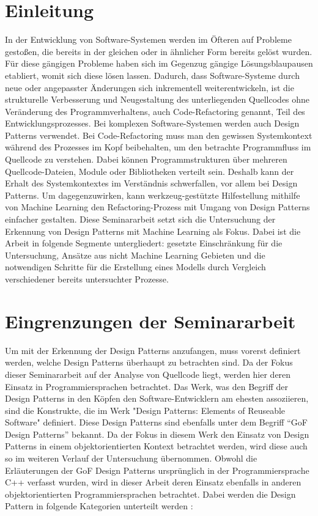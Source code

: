 \documentclass[conference]{IEEEtran}
\begin{document}
\section{Einleitung}
In der Entwicklung von Software-Systemen werden im Öfteren auf Probleme gestoßen, die bereits in der gleichen oder in ähnlicher Form bereits gelöst wurden. Für diese gängigen Probleme haben sich im Gegenzug gängige Lösungsblaupausen etabliert, womit sich diese lösen lassen.
Dadurch, dass Software-Systeme durch neue oder angepasster Änderungen sich inkrementell weiterentwickeln, ist die strukturelle Verbesserung und Neugestaltung des unterliegenden Quellcodes ohne Veränderung des Programmverhaltens, auch Code-Refactoring genannt, Teil des Entwicklungsprozesses.
Bei komplexen Software-Systemen werden auch Design Patterns verwendet. Bei Code-Refactoring muss man den gewissen Systemkontext während des Prozesses im Kopf beibehalten, um den betrachte Programmfluss im Quellcode zu verstehen.
Dabei können Programmstrukturen über mehreren Quellcode-Dateien, Module oder Bibliotheken verteilt sein. Deshalb kann der Erhalt des Systemkontextes im Verständnis schwerfallen, vor allem bei Design Patterns. Um dagegenzuwirken, kann werkzeug-gestützte Hilfestellung mithilfe von Machine Learning den Refactoring-Prozess mit Umgang von Design Patterns einfacher gestalten.
Diese Seminararbeit setzt sich die Untersuchung der Erkennung von Design Patterns mit Machine Learning als Fokus. Dabei ist die Arbeit in folgende Segmente untergliedert: gesetzte Einschränkung für die Untersuchung, Ansätze aus nicht Machine Learning Gebieten und die notwendigen Schritte für die Erstellung eines Modells durch Vergleich verschiedener bereits untersuchter Prozesse.



\section{Eingrenzungen der Seminararbeit}
Um mit der Erkennung der Design Patterns anzufangen, muss vorerst definiert werden, welche Design Patterns überhaupt zu betrachten sind. Da der Fokus dieser Seminararbeit auf der Analyse von Quellcode liegt, werden hier deren Einsatz in Programmiersprachen betrachtet.
Das Werk, was den Begriff der Design Patterns in den Köpfen den Software-Entwicklern am ehesten assoziieren, sind die Konstrukte, die im Werk "Design Patterns: Elements of Reuseable Software" definiert. Diese Design Patterns sind ebenfalls unter dem Begriff ``GoF Design Patterns'' bekannt. Da der Fokus in diesem Werk den Einsatz von Design Patterns in einem
objektorientierten Kontext betrachtet werden, wird diese auch so im weiteren Verlauf der Untersuchung übernommen. Obwohl die Erläuterungen der GoF Design Patterns ursprünglich in der Programmiersprache C++ verfasst wurden, wird in dieser Arbeit deren Einsatz ebenfalls in anderen objektorientierten Programmiersprachen betrachtet.
Dabei werden die Design Pattern in folgende Kategorien unterteilt werden \cite[p. 5797]{Yarahmadi2020}:
\end{document}
